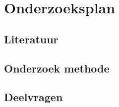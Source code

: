 \chapter{Onderzoeksplan}

\section{Literatuur} %

\section{Onderzoek methode} %

\section{Deelvragen} %


